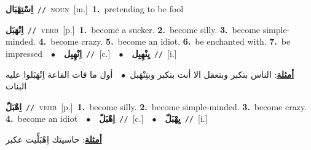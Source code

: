 \documentclass[10pt,a4paper,twoside]{article} %
\begin{document}
\begin{multicols}{2}
{\setlength\topsep{0pt}\textbf{\foreignlanguage{arabic}{اِسْتِهْبَال}}\ {\color{gray}\texttt{//}\color{black}}\ \textsc{noun}\ [m.]\ \textbf{1.}~pretending to be fool\ } \vspace{2mm}

{\setlength\topsep{0pt}\textbf{\foreignlanguage{arabic}{اِنْهَبَل}}\ {\color{gray}\texttt{//}\color{black}}\ \textsc{verb}\ [p.]\ \textbf{1.}~become a sucker.  \textbf{2.}~become silly.  \textbf{3.}~become simple-minded.  \textbf{4.}~become crazy.  \textbf{5.}~become an idiot.  \textbf{6.}~be enchanted with.  \textbf{7.}~be impressed\ \ $\bullet$\ \ \setlength\topsep{0pt}\textbf{\foreignlanguage{arabic}{اِنْهِبِل}}\ {\color{gray}\texttt{//}\color{black}}\ [c.]\ \ $\bullet$\ \ \setlength\topsep{0pt}\textbf{\foreignlanguage{arabic}{يِنْهِبِل}}\ {\color{gray}\texttt{//}\color{black}}\ [i.]\  \begin{flushright}\color{gray}\foreignlanguage{arabic}{\textbf{\underline{\foreignlanguage{arabic}{أمثلة}}}: الناس بتكبر وبتعقل الا أنت بتكبر وبتِنْهَبل\ $\bullet$\ \  أول ما فات القاعة اِنْهَبَلوا عليه البنات}\end{flushright}\color{black}} \vspace{2mm}

{\setlength\topsep{0pt}\textbf{\foreignlanguage{arabic}{اِهْبَلّ}}\ {\color{gray}\texttt{//}\color{black}}\ \textsc{verb}\ [p.]\ \textbf{1.}~become silly.  \textbf{2.}~become simple-minded.  \textbf{3.}~become crazy.  \textbf{4.}~become an idiot\ \ $\bullet$\ \ \setlength\topsep{0pt}\textbf{\foreignlanguage{arabic}{اِهْبَلّ}}\ {\color{gray}\texttt{//}\color{black}}\ [c.]\ \ $\bullet$\ \ \setlength\topsep{0pt}\textbf{\foreignlanguage{arabic}{يِهْبَلّ}}\ {\color{gray}\texttt{//}\color{black}}\ [i.]\  \begin{flushright}\color{gray}\foreignlanguage{arabic}{\textbf{\underline{\foreignlanguage{arabic}{أمثلة}}}: حاسيتك اِهْبَلِّيت عكبر}\end{flushright}\color{black}} \vspace{2mm}


\end{multicols}
\end{document}
